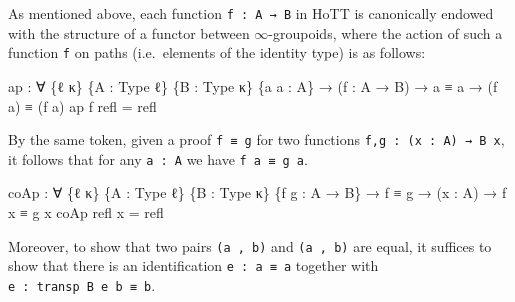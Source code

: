 \documentclass[
  11pt,
  oneside,
  article]{memoir}
\newenvironment{Shaded}{}{}
\newcommand{\NormalTok}[1]{#1}
\newcommand{\OtherTok}[1]{\textcolor[rgb]{0.00,0.44,0.13}{#1}}
\theoremstyle{definition}
\theoremstyle{plain}
\newcommand{\0}{\textsf{0}}
\newcommand{\1}{\tn{\textsf{1}}}
\begin{document}
As mentioned above, each function \texttt{f\ :\ A\ →\ B} in HoTT is
canonically endowed with the structure of a functor between
\(\infty\)-groupoids, where the action of such a function \texttt{f} on
paths (i.e.~elements of the identity type) is as follows:

\begin{Shaded}
\begin{Highlighting}[]
\NormalTok{ap }\OtherTok{:} \OtherTok{∀} \OtherTok{\{}\NormalTok{ℓ κ}\OtherTok{\}} \OtherTok{\{}\NormalTok{A }\OtherTok{:}\NormalTok{ Type ℓ}\OtherTok{\}} \OtherTok{\{}\NormalTok{B }\OtherTok{:}\NormalTok{ Type κ}\OtherTok{\}} \OtherTok{\{}\NormalTok{a a\textquotesingle{} }\OtherTok{:}\NormalTok{ A}\OtherTok{\}}
     \OtherTok{→} \OtherTok{(}\NormalTok{f }\OtherTok{:}\NormalTok{ A }\OtherTok{→}\NormalTok{ B}\OtherTok{)} \OtherTok{→}\NormalTok{ a ≡ a\textquotesingle{} }\OtherTok{→} \OtherTok{(}\NormalTok{f a}\OtherTok{)}\NormalTok{ ≡ }\OtherTok{(}\NormalTok{f a\textquotesingle{}}\OtherTok{)}
\NormalTok{ap f refl }\OtherTok{=}\NormalTok{ refl}
\end{Highlighting}
\end{Shaded}

By the same token, given a proof \texttt{f\ ≡\ g} for two functions
\texttt{f,g\ :\ (x\ :\ A)\ →\ B\ x}, it follows that for any
\texttt{a\ :\ A} we have \texttt{f\ a\ ≡\ g\ a}.

\begin{Shaded}
\begin{Highlighting}[]
\NormalTok{coAp }\OtherTok{:} \OtherTok{∀} \OtherTok{\{}\NormalTok{ℓ κ}\OtherTok{\}} \OtherTok{\{}\NormalTok{A }\OtherTok{:}\NormalTok{ Type ℓ}\OtherTok{\}} \OtherTok{\{}\NormalTok{B }\OtherTok{:}\NormalTok{ Type κ}\OtherTok{\}} \OtherTok{\{}\NormalTok{f g }\OtherTok{:}\NormalTok{ A }\OtherTok{→}\NormalTok{ B}\OtherTok{\}}
       \OtherTok{→}\NormalTok{ f ≡ g }\OtherTok{→} \OtherTok{(}\NormalTok{x }\OtherTok{:}\NormalTok{ A}\OtherTok{)} \OtherTok{→}\NormalTok{ f x ≡ g x}
\NormalTok{coAp refl x }\OtherTok{=}\NormalTok{ refl}
\end{Highlighting}
\end{Shaded}

Moreover, to show that two pairs \texttt{(a\ ,\ b)} and
\texttt{(a\textquotesingle{}\ ,\ b\textquotesingle{})} are equal, it
suffices to show that there is an identification
\texttt{e\ :\ a\ ≡\ a\textquotesingle{}} together with
\texttt{e\textquotesingle{}\ :\ transp\ B\ e\ b\ ≡\ b\textquotesingle{}}.
\end{document}
